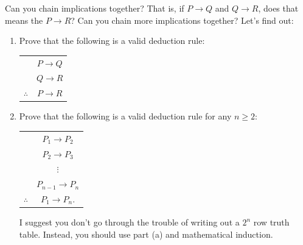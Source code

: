 \documentclass[10pt,]{book}
\theoremstyle{plain}
\theoremstyle{definition}
\theoremstyle{definition}
\theoremstyle{definition}
\theoremstyle{definition}
\numberwithin{equation}{chapter}
\newcommand{\hrulethin}  {\noalign{\hrule height 0.04em}}
\def\imp{\rightarrow}
\begin{document}
\begin{divisionexercise}{13}\hypertarget{exercise-232}{}
\hypertarget{p-1997}{}%
Can you chain implications together? That is, if \(P \imp Q\) and \(Q \imp R\), does that means the \(P \imp R\)? Can you chain more implications together? Let's find out:%
\par
\hypertarget{p-1998}{}%
\leavevmode%
\begin{enumerate}[label=(\alph*)]
\item\hypertarget{li-661}{}\hypertarget{p-1999}{}%
Prove that the following is a valid deduction rule:%
\begin{sidebyside}{1}{0}{0}{0}
\begin{sbspanel}{1}
{\centering%
\begin{tabular}{cc}
&\(P \imp Q\)\tabularnewline[0pt]
&\(Q \imp R\)\tabularnewline\hrulethin
\(\therefore\)&\(P \imp R\)
\end{tabular}
\par}
\end{sbspanel}
\end{sidebyside}
\item\hypertarget{li-662}{}\hypertarget{p-2000}{}%
Prove that the following is a valid deduction rule for any \(n \ge 2\):%
\begin{sidebyside}{1}{0}{0}{0}
\begin{sbspanel}{1}
{\centering%
\begin{tabular}{cc}
&\(P_1 \imp P_2\)\tabularnewline[0pt]
&\(P_2 \imp P_3\)\tabularnewline[0pt]
&\(\vdots\)\tabularnewline[0pt]
&\(P_{n-1} \imp P_n\)\tabularnewline\hrulethin
\(\therefore\)&\(P_1 \imp P_n\).
\end{tabular}
\par}
\end{sbspanel}
\end{sidebyside}
\par
\hypertarget{p-2001}{}%
I suggest you don't go through the trouble of writing out a \(2^n\) row truth table. Instead, you should use part (a) and mathematical induction. %
\end{enumerate}
%
\end{divisionexercise}%
\end{document}
